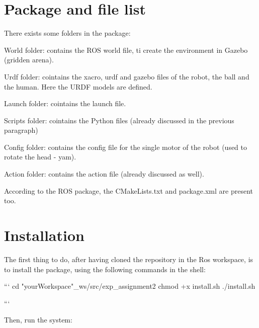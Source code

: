 \section*{Package and file list}

There exists some folders in the package\+:


\begin{DoxyItemize}
\item World folder\+: contains the R\+OS world file, ti create the environment in Gazebo (gridden arena).
\end{DoxyItemize}

 


\begin{DoxyItemize}
\item Urdf folder\+: cointains the xacro, urdf and gazebo files of the robot, the ball and the human. Here the U\+R\+DF models are defined.
\end{DoxyItemize}

 

 


\begin{DoxyItemize}
\item Launch folder\+: cointains the launch file.
\item Scripts folder\+: cointains the Python files (already discussed in the previous paragraph)
\item Config folder\+: contains the config file for the single motor of the robot (used to rotate the head -\/ yam).
\item Action folder\+: contains the action file (already discussed as well).
\end{DoxyItemize}

According to the R\+OS package, the C\+Make\+Lists.\+txt and package.\+xml are present too.

\section*{Installation}

The first thing to do, after having cloned the repository in the Ros workspace, is to install the package, using the following commands in the shell\+:

\begin{DoxyVerb}```
cd "yourWorkspace"_ws/src/exp_assignment2
chmod +x install.sh 
./install.sh 

```
\end{DoxyVerb}


Then, run the system\+:

